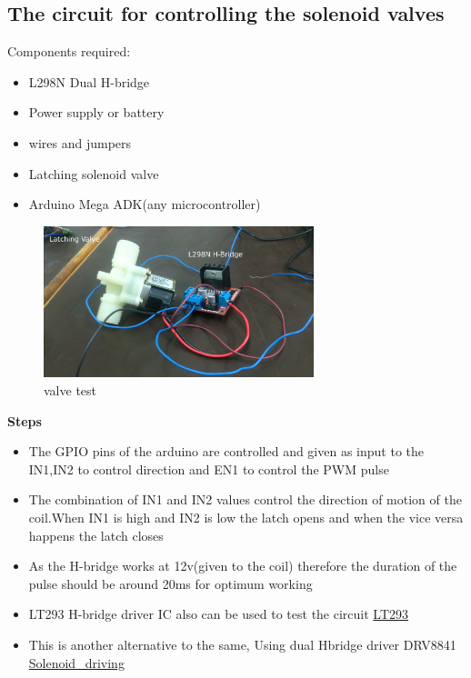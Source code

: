\documentclass[16pt]{article}
\begin{document}
\vspace{0.5cm}

\subsection{The circuit for controlling the solenoid valves}

Components required:

\begin{itemize}

\item
  L298N Dual H-bridge
\item
  Power supply or battery
\item
  wires and jumpers
\item
  Latching solenoid valve
\item
  Arduino Mega ADK(any microcontroller)
\end{itemize}


\begin{figure}

\hspace{2cm}
\includegraphics[width=0.7\textwidth]{images/valve.jpg}
\caption{valve test}
\end{figure}

\textbf{Steps}

\begin{itemize}

\item
  The GPIO pins of the arduino are controlled and given as input to the
  IN1,IN2 to control direction and EN1 to control the PWM pulse
\item
  The combination of IN1 and IN2 values control the direction of motion
  of the coil.When IN1 is high and IN2 is low the latch opens and when
  the vice versa happens the latch closes
\item
  As the H-bridge works at 12v(given to the coil) therefore the duration
  of the pulse should be around 20ms for optimum working
\item
  LT293 H-bridge driver IC also can be used to test the
  circuit {\color{red}\href{http://www.ti.com/lit/ds/symlink/l293.pdf}{LT293}}
\item
  This is another alternative to the same, Using dual Hbridge driver
  DRV8841
  {\color{red}\href{http://www.ti.com/lit/an/slva460/slva460.pdf}{Solenoid\_driving}}
\end{itemize}
\end{document}
